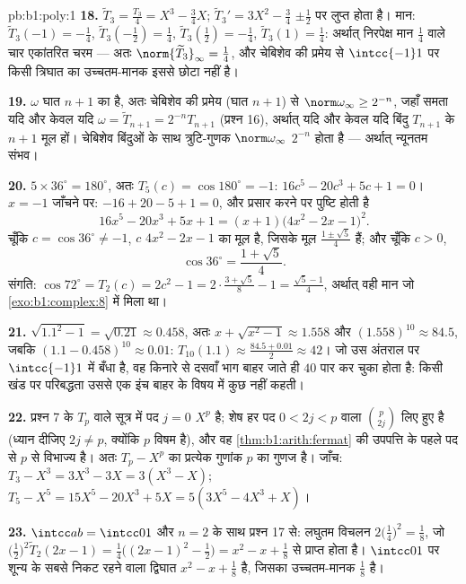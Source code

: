 \begin{solution}{pb:b1:poly:1}
\textbf{18.} $\widetilde T_3 = \frac{T_3}4 = X^3 - \frac34X$; $\widetilde
T_3{}' = 3X^2 - \frac34$ $\pm\frac12$ पर लुप्त होता है। मान: $\widetilde
T_3(-1) = -\frac14$, $\widetilde T_3(-\tfrac12) = \frac14$, $\widetilde
T_3(\tfrac12) = -\frac14$, $\widetilde T_3(1) = \frac14$: अर्थात् निरपेक्ष
मान $\frac14$ वाले चार एकांतरित चरम --- अतः $\norm{\widetilde T_3}_\infty =
\frac14$, और चेबिशेव की प्रमेय से $\intcc{-1}1$ पर किसी  त्रिघात का
उच्चतम-मानक इससे छोटा नहीं है।

\textbf{19.} $\omega$ घात $n + 1$ का  है, अतः चेबिशेव की प्रमेय
(घात $n+1$) से $\norm\omega_\infty \geq 2^{-n}$, जहाँ समता यदि और केवल यदि
$\omega = \widetilde T_{n+1} = 2^{-n}T_{n+1}$ (प्रश्न 16), अर्थात् यदि और
केवल यदि बिंदु $T_{n+1}$ के $n + 1$ मूल हों। चेबिशेव बिंदुओं के साथ
त्रुटि-गुणक $\norm\omega_\infty$ $2^{-n}$ होता है --- अर्थात् न्यूनतम संभव।

\textbf{20.} $5 \times 36^\circ = 180^\circ$, अतः $T_5(c) = \cos180^\circ =
-1$: $16c^5 - 20c^3 + 5c + 1 = 0$। $x = -1$ जाँचने पर: $-16 + 20 - 5 + 1 =
0$, और प्रसार करने पर पुष्टि होती है
\[
16x^5 - 20x^3 + 5x + 1 = (x + 1)\bigl(4x^2 - 2x - 1\bigr)^2 .
\]
चूँकि $c = \cos36^\circ \neq -1$, $c$ $4x^2 - 2x - 1$ का मूल है, जिसके मूल
$\frac{1 \pm \sqrt5}4$ हैं; और चूँकि $c > 0$,
\[
\cos36^\circ = \frac{1 + \sqrt5}4 .
\]
संगति: $\cos72^\circ = T_2(c) = 2c^2 - 1 = 2\cdot\frac{3 + \sqrt5}8 - 1 =
\frac{\sqrt5 - 1}4$, अर्थात् वही मान जो \cref{exo:b1:complex:8} में मिला था।

\textbf{21.} $\sqrt{1.1^2 - 1} = \sqrt{0.21} \approx 0.458$, अतः $x +
\sqrt{x^2-1} \approx 1.558$ और $(1.558)^{10} \approx 84.5$, जबकि $(1.1 -
0.458)^{10} \approx 0.01$: $T_{10}(1.1) \approx \frac{84.5 + 0.01}2 \approx
42$। जो  उस अंतराल पर $\intcc{-1}1$ में बँधा है, वह किनारे से दसवाँ भाग
बाहर जाते ही $40$ पार कर चुका होता है: किसी खंड पर परिबद्धता उससे एक इंच
बाहर के विषय में कुछ नहीं कहती।

\textbf{22.} प्रश्न 7 के $T_p$ वाले सूत्र में पद $j = 0$ $X^p$ है; शेष हर पद
$0 < 2j < p$ वाला $\binom p{2j}$ लिए हुए है (ध्यान दीजिए $2j \neq p$,
क्योंकि $p$ विषम है), और वह \cref{thm:b1:arith:fermat} की उपपत्ति के पहले पद
से $p$ से विभाज्य है। अतः $T_p - X^p$ का प्रत्येक गुणांक $p$ का गुणज है।
जाँच: $T_3 - X^3 = 3X^3 - 3X = 3(X^3 - X)$; $T_5 - X^5 = 15X^5 - 20X^3 + 5X
= 5(3X^5 - 4X^3 + X)$।

\textbf{23.} $\intcc ab = \intcc01$ और $n = 2$ के साथ प्रश्न 17 से: लघुतम
विचलन $2\bigl(\frac14\bigr)^2 = \frac18$, जो
$\bigl(\frac12\bigr)^2\widetilde T_2(2x - 1) = \frac14\bigl((2x-1)^2 -
\frac12\bigr) = x^2 - x + \frac18$ से प्राप्त होता है। $\intcc01$ पर शून्य
के सबसे निकट रहने वाला  द्विघात $x^2 - x + \frac18$ है, जिसका
उच्चतम-मानक $\frac18$ है।


\end{solution}
